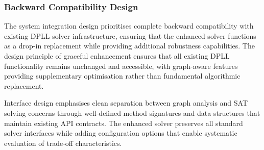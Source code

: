 \subsubsection{Backward Compatibility Design}

The system integration design prioritises complete backward compatibility with existing DPLL solver infrastructure, ensuring that the enhanced solver functions as a drop-in replacement while providing additional robustness capabilities. The design principle of graceful enhancement ensures that all existing DPLL functionality remains unchanged and accessible, with graph-aware features providing supplementary optimisation rather than fundamental algorithmic replacement.

Interface design emphasises clean separation between graph analysis and SAT solving concerns through well-defined method signatures and data structures that maintain existing API contracts. The enhanced solver preserves all standard solver interfaces while adding configuration options that enable systematic evaluation of trade-off characteristics.

